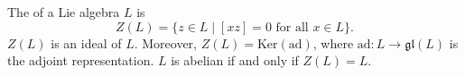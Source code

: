 The  of a Lie algebra $L$ is
$$Z(L) = \{z \in L \mid [xz] = 0 \text{ for all } x \in L\}.$$
$Z(L)$ is an ideal of $L$. Moreover, $Z(L) = \text{Ker}(\text{ad})$, where $\text{ad}: L \rightarrow \mathfrak{gl}(L)$ is the adjoint representation. $L$ is abelian if and only if $Z(L) = L$.
